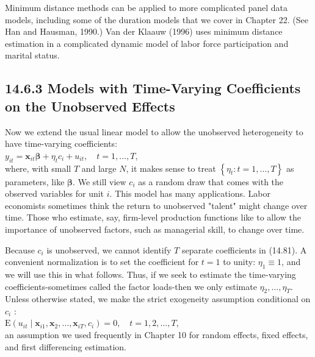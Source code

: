 \documentclass[10pt]{article}
\begin{document}
Minimum distance methods can be applied to more complicated panel data models, including some of the duration models that we cover in Chapter 22. (See Han and Hausman, 1990.) Van der Klaauw (1996) uses minimum distance estimation in a complicated dynamic model of labor force participation and marital status.

\subsection*{14.6.3 Models with Time-Varying Coefficients on the Unobserved Effects}
Now we extend the usual linear model to allow the unobserved heterogeneity to have time-varying coefficients:\\
$y_{i t}=\mathbf{x}_{i t} \boldsymbol{\beta}+\eta_{t} c_{i}+u_{i t}, \quad t=1, \ldots, T$,\\
where, with small $T$ and large $N$, it makes sense to treat $\left\{\eta_{t}: t=1, \ldots, T\right\}$ as parameters, like $\boldsymbol{\beta}$. We still view $c_{i}$ as a random draw that comes with the observed variables for unit $i$. This model has many applications. Labor economists sometimes think the return to unobserved "talent" might change over time. Those who estimate, say, firm-level production functions like to allow the importance of unobserved factors, such as managerial skill, to change over time.

Because $c_{i}$ is unobserved, we cannot identify $T$ separate coefficients in (14.81). A convenient normalization is to set the coefficient for $t=1$ to unity: $\eta_{1} \equiv 1$, and\\
we will use this in what follows. Thus, if we seek to estimate the time-varying coefficients-sometimes called the factor loads-then we only estimate $\eta_{2}, \ldots, \eta_{T}$. Unless otherwise stated, we make the strict exogeneity assumption conditional on $c_{i}$ :\\
$\mathrm{E}\left(u_{i t} \mid \mathbf{x}_{i 1}, \mathbf{x}_{2}, \ldots, \mathbf{x}_{i T}, c_{i}\right)=0, \quad t=1,2, \ldots, T$,\\
an assumption we used frequently in Chapter 10 for random effects, fixed effects, and first differencing estimation.
\end{document}
